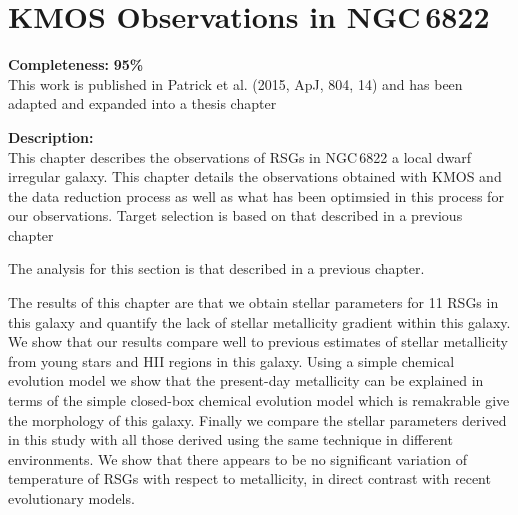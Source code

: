 \chapter{KMOS Observations in NGC\,6822}

\textbf{Completeness:} \textbf{95\%} \\
This work is published in Patrick et al. (2015, ApJ, 804, 14) and has been
adapted and expanded into a thesis chapter

\textbf{Description:} \\
This chapter describes the observations of RSGs in NGC\,6822 a local dwarf
irregular galaxy. This chapter details the observations obtained with KMOS
and the data reduction process as well as what has been optimsied in this process
for our observations.
Target selection is based on that described in a previous chapter

The analysis for this section is that described in a previous chapter.

The results of this chapter are that we obtain stellar parameters for 11 RSGs
in this galaxy and quantify the lack of stellar metallicity gradient within
this galaxy.
We show that our results compare well to previous estimates of stellar
metallicity from young stars and HII regions in this galaxy.
Using a simple chemical evolution model we show that the present-day
metallicity can be explained in terms of the simple closed-box chemical
evolution model which is remakrable give the morphology of this galaxy.
Finally we compare the stellar parameters derived in this study with all those
derived using the same technique in different environments.
We show that there appears to be no significant variation of temperature of RSGs
with respect to metallicity, in direct contrast with recent evolutionary models.
